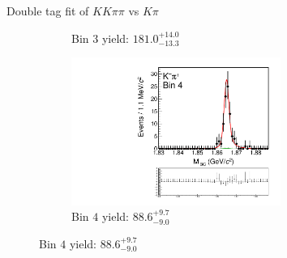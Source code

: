 \documentclass{beamer}
\begin{document}
\begin{frame}{Double tag fit of $KK\pi\pi$ vs $K\pi$}
\begin{figure}
\begin{subfigure}{0.5\textwidth}
      \caption{Bin $3$ yield: $181.0_{-13.3}^{+14.0}$}
    \end{subfigure}%
    \begin{subfigure}{0.5\textwidth}
      \centering
      \includegraphics[width=0.75\textwidth,trim={0 5cm 0 0},clip=true]{Plots/DoubleTagYield_DoubleTag_Flavour_KKpipi_vs_Kpi_SignalBinP4_TagBin0.pdf}
      \caption{Bin $4$ yield: $88.6_{-9.0}^{+9.7}$}
    \end{subfigure}
  \end{figure}
\end{frame}
\end{document}
